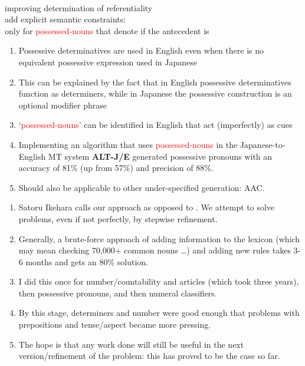 \documentclass[a4paper,landscape,headrule,footrule,dvips]{foils}
\newcommand{\trg}[1]{\textcolor{red}{#1}}
\newcommand{\hsp}{\hspace*{1.5cm}}
\newcommand{\hhsp}{\hspace*{2.5cm}}
\begin{document}
\begin{CJK}{UTF8}{min}
 \\
\hsp improving determination of referentiality \\
\hsp add explicit semantic constraints: \\only  
for \trg{possessed-nouns} that denote   if the antecedent is 


  \begin{enumerate}
  \item Possessive determinatives are used in English even when there
    is no equivalent possessive expression used in Japanese
  \item This can be explained by the fact that in English possessive
    determinatives function as determiners, while in Japanese the
    possessive construction is an optional modifier phrase
  \item `\trg{possessed-nouns}' can be identified in English that act
    (imperfectly) as cues
  \item Implementing an algorithm  that uses
    \trg{possessed-nouns} in the Japanese-to-English MT system {\bf
      ALT-J/E} generated possessive pronouns with an accuracy of
    81\% (up from 57\%) and precision of 88\%.
  \item Should also be applicable to other under-specified generation: AAC.
  \end{enumerate}


\begin{enumerate}\addtolength{\itemsep}{-3mm}
\item Satoru Ikehara calls our approach  as opposed
  to .  We attempt to
  solve problems, even if not perfectly, by stepwise refinement.
\item Generally, a brute-force approach of adding information to the lexicon
  (which may mean checking 70,000+ common nouns \ldots) and adding new
  rules takes 3-6 months and gets an 80\% solution.
\item I did this once for number/countability and articles (which took
  three years), then possessive pronouns, and then numeral
  classifiers. 
\item By this stage, determiners and number were good enough that problems with
  prepositions and tense/aspect became more pressing.
\item The hope is that any work done will still be useful in the next
  version/refinement of the problem: this has proved to be the case so
  far.


\end{enumerate}
\end{CJK}
\end{document}

